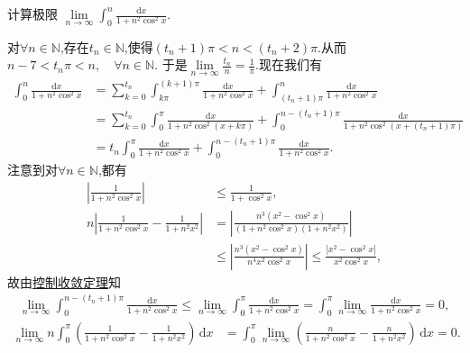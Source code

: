 \documentclass[../../main.tex]{subfiles}%
\begin{document}
\begin{example}
计算极限 $\lim\limits_{n \to \infty} \int_{0}^{n} \frac{\mathrm{d}x}{1 + n^2 \cos^2 x}$.
\end{example}
\begin{solution}
对$\forall n\in \mathbb{N}$,存在$t_n\in \mathbb{N}$,使得$\left( t_n+1 \right) \pi <n<\left( t_n+2 \right) \pi$.从而
$n-7<t_n\pi <n,\quad \forall n\in \mathbb{N}$.
于是$\lim\limits_{n\rightarrow \infty}\frac{t_n}{n}=\frac{1}{\pi}$.现在我们有
\begin{align}
\int_0^n{\frac{\mathrm{d}x}{1+n^2\cos ^2x}}&=\sum\limits_{k=0}^{t_n}{\int_{k\pi}^{\left( k+1 \right) \pi}{\frac{\mathrm{d}x}{1+n^2\cos ^2x}}}+\int_{\left( t_n+1 \right) \pi}^n{\frac{\mathrm{d}x}{1+n^2\cos ^2x}} \nonumber \\
&=\sum\limits_{k=0}^{t_n}{\int_0^{\pi}{\frac{\mathrm{d}x}{1+n^2\cos ^2\left( x+k\pi \right)}}}+\int_0^{n-\left( t_n+1 \right) \pi}{\frac{\mathrm{d}x}{1+n^2\cos ^2\left( x+\left( t_n+1 \right) \pi \right)}} \nonumber \\
&=t_n\int_0^{\pi}{\frac{\mathrm{d}x}{1+n^2\cos ^2x}}+\int_0^{n-\left( t_n+1 \right) \pi}{\frac{\mathrm{d}x}{1+n^2\cos ^2x}}. \label{eq:177.12}
\end{align}
注意到对$\forall n\in \mathbb{N}$,都有
\begin{align*}
\left| \frac{1}{1+n^2\cos ^2x} \right|&\leqslant \frac{1}{1+\cos ^2x}, \\
n\left| \frac{1}{1+n^2\cos ^2x}-\frac{1}{1+n^2x^2} \right|&=\left| \frac{n^3\left( x^2-\cos ^2x \right)}{\left( 1+n^2\cos ^2x \right) \left( 1+n^2x^2 \right)} \right| \\
&\leqslant \left| \frac{n^3\left( x^2-\cos ^2x \right)}{n^4x^2\cos ^2x} \right|\leqslant \frac{\left| x^2-\cos ^2x \right|}{x^2\cos ^2x},
\end{align*}
故由\hyperref[Real Analysis-theorem:控制收敛定理]{控制收敛定理}知
\begin{align}
\lim\limits_{n\rightarrow \infty}\int_0^{n-\left( t_n+1 \right) \pi}{\frac{\mathrm{d}x}{1+n^2\cos ^2x}}\leqslant \lim\limits_{n\rightarrow \infty}\int_0^{\pi}{\frac{\mathrm{d}x}{1+n^2\cos ^2x}}=\int_0^{\pi}{\lim\limits_{n\rightarrow \infty}\frac{\mathrm{d}x}{1+n^2\cos ^2x}}=0, \label{eq:177.13}
\end{align}
\begin{align*}
\lim\limits_{n\rightarrow \infty}n\int_0^{\pi}{\left( \frac{1}{1+n^2\cos ^2x}-\frac{1}{1+n^2x^2} \right)\,\mathrm{d}x}&=\int_0^{\pi}{\lim\limits_{n\rightarrow \infty}\left( \frac{n}{1+n^2\cos ^2x}-\frac{n}{1+n^2x^2} \right)\,\mathrm{d}x}=0.

\end{align*}
\end{solution}
\end{document}
